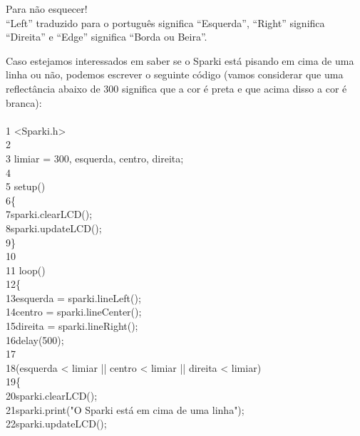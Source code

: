 \documentclass[conference]{IEEEtran}
\begin{document}
\begin{center}
    {\color{azulbebe}Para não esquecer!}\\
    “Left” traduzido para o português significa “Esquerda”, “Right” significa “Direita” e “Edge” significa “Borda ou Beira”.
\end{center}

\par
Caso estejamos interessados em saber se o Sparki está pisando em cima de uma linha ou não, podemos escrever o seguinte código (vamos considerar que uma reflectância abaixo de 300 significa que a cor é preta e que acima disso a cor é branca):
\\
\\
{\selectfont
{\color{gray}1} <Sparki.h>\\
{\color{gray}2}\\
{\color{gray}3} limiar = 300, esquerda, centro, direita;\\
{\color{gray}4}\\
{\color{gray}5} setup()\\
{\color{gray}6}\quad\{\\
{\color{gray}7}\quad\quad sparki.clearLCD();\\
{\color{gray}8}\quad\quad sparki.updateLCD();\\
{\color{gray}9}\quad\}\\
{\color{gray}10}\\
{\color{gray}11} loop()\\
{\color{gray}12}\quad\{\\
{\color{gray}13}\quad\quad esquerda = sparki.lineLeft();\\
{\color{gray}14}\quad\quad centro = sparki.lineCenter();\\
{\color{gray}15}\quad\quad direita = sparki.lineRight();\\
{\color{gray}16}\quad\quad delay(500);\\
{\color{gray}17}\\
{\color{gray}18}\quad{}(esquerda < limiar || centro < limiar || direita < limiar)\\
{\color{gray}19}\quad\quad \{\\
{\color{gray}20}\quad\quad\quad sparki.clearLCD();\\
{\color{gray}21}\quad\quad\quad sparki.print("O Sparki está em cima de uma linha");\\
{\color{gray}22}\quad\quad\quad sparki.updateLCD();\\
}
\end{document}
